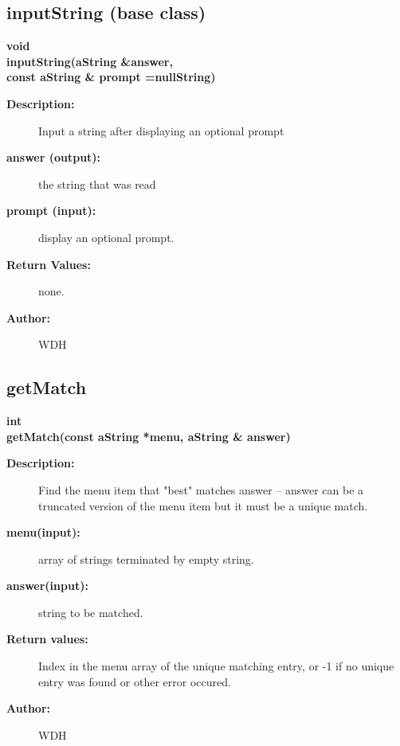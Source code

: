 \subsection{inputString (base class)}
 
\begin{flushleft} \textbf{%
void  \\ 
\settowidth{\GenericGraphicsInterfaceIncludeArgIndent}{inputString(}%
inputString(aString \&answer, \\ 
\hspace{\GenericGraphicsInterfaceIncludeArgIndent}const aString \& prompt  =nullString)
}\end{flushleft}
\begin{description}
\item[{\bf Description:}] 
   Input a string after displaying an optional prompt
\item[{\bf answer (output):}]  the string that was read
\item[{\bf prompt (input):}]  display an optional prompt.
\item[{\bf Return Values:}]  none.

\item[{\bf Author:}]  WDH
\end{description}
\subsection{getMatch}
 
\begin{flushleft} \textbf{%
int  \\ 
\settowidth{\GenericGraphicsInterfaceIncludeArgIndent}{getMatch(}%
getMatch(const aString *menu, aString \& answer)
}\end{flushleft}
\begin{description}
\item[{\bf Description:}] 
  Find the menu item that "best" matches answer -- answer can be a truncated version
  of the menu item but it must be a unique match.
\item[{\bf menu(input):}]  array of strings terminated by empty string.
\item[{\bf answer(input):}]  string to be matched.
\item[{\bf Return values:}]  Index in the menu array of the unique matching entry, or -1 if
 no unique entry was found or other error occured.
  
\item[{\bf Author:}]  WDH
\end{description}
